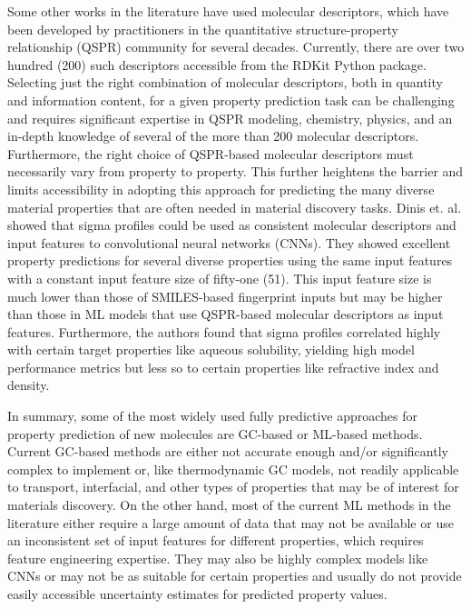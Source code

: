\documentclass[journal=jacsat,manuscript=article]{achemso}
\begin{document}
 Some other works in the literature have used molecular descriptors, which have been developed by practitioners in the quantitative structure-property relationship (QSPR) community for several decades. Currently, there are over two hundred (200) such descriptors accessible from the RDKit Python package. Selecting just the right combination of molecular descriptors, both in quantity and information content, for a given property prediction task can be challenging and requires significant expertise in QSPR modeling, chemistry, physics, and an in-depth knowledge of several of the more than 200 molecular descriptors. Furthermore, the right choice of QSPR-based molecular descriptors must necessarily vary from property to property. This further heightens the barrier and limits accessibility in adopting this approach for predicting the many diverse material properties that are often needed in material discovery tasks.
Dinis et. al. \cite{abranchesSigmaProfilesDeep2022} showed that sigma profiles could be used as consistent molecular descriptors and input features to convolutional neural networks (CNNs). They showed excellent property predictions for several diverse properties using the same input features with a constant input feature size of fifty-one (51). This input feature size is much lower than those of SMILES-based fingerprint inputs but may be higher than those in ML models that use QSPR-based molecular descriptors as input features. Furthermore, the authors found that sigma profiles correlated highly with certain target properties like aqueous solubility, yielding high model performance metrics but less so to certain properties like refractive index and density.

In summary, some of the most widely used fully predictive approaches for property prediction of new molecules are GC-based or ML-based methods. Current GC-based methods are either not accurate enough and/or significantly complex to implement or, like thermodynamic GC models, not readily applicable to transport, interfacial, and other types of properties that may be of interest for materials discovery. On the other hand, most of the current ML methods in the literature either require a large amount of data that may not be available or use an inconsistent set of input features for different properties, which requires feature engineering expertise. They may also be highly complex models like CNNs or may not be as suitable for certain properties and usually do not provide easily accessible uncertainty estimates for predicted property values.
\end{document}
